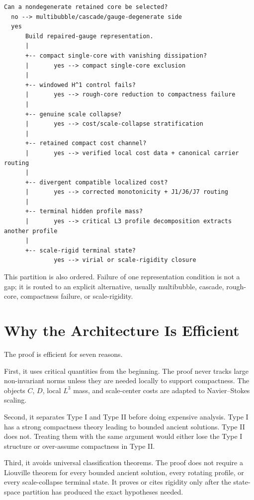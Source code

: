 \documentclass[11pt]{amsart}
\begin{document}
\begin{center}
\begin{minipage}{0.92\linewidth}
\scriptsize
\begin{verbatim}
Can a nondegenerate retained core be selected?
  no --> multibubble/cascade/gauge-degenerate side
  yes
      Build repaired-gauge representation.
      |
      +-- compact single-core with vanishing dissipation?
      |       yes --> compact single-core exclusion
      |
      +-- windowed H^1 control fails?
      |       yes --> rough-core reduction to compactness failure
      |
      +-- genuine scale collapse?
      |       yes --> cost/scale-collapse stratification
      |
      +-- retained compact cost channel?
      |       yes --> verified local cost data + canonical carrier routing
      |
      +-- divergent compatible localized cost?
      |       yes --> corrected monotonicity + J1/J6/J7 routing
      |
      +-- terminal hidden profile mass?
      |       yes --> critical L3 profile decomposition extracts another profile
      |
      +-- scale-rigid terminal state?
              yes --> virial or scale-rigidity closure
\end{verbatim}
\end{minipage}
\end{center}

This partition is also ordered.  Failure of one representation condition is not a gap; it is routed to an explicit alternative, usually multibubble, cascade, rough-core, compactness failure, or scale-rigidity.

\section{Why the Architecture Is Efficient}

The proof is efficient for seven reasons.

First, it uses critical quantities from the beginning.  The proof never tracks large non-invariant norms unless they are needed locally to support compactness. The objects \(C\), \(D\), local \(L^3\) mass, and scale-center costs are adapted to Navier--Stokes scaling.

Second, it separates Type I and Type II before doing expensive analysis.  Type I has a strong compactness theory leading to bounded ancient solutions.  Type II does not.  Treating them with the same argument would either lose the Type I structure or over-assume compactness in Type II.

Third, it avoids universal classification theorems.  The proof does not require a Liouville theorem for every bounded ancient solution, every rotating profile, or every scale-collapse terminal state.  It proves or cites rigidity only after the state-space partition has produced the exact hypotheses needed.
\end{document}
